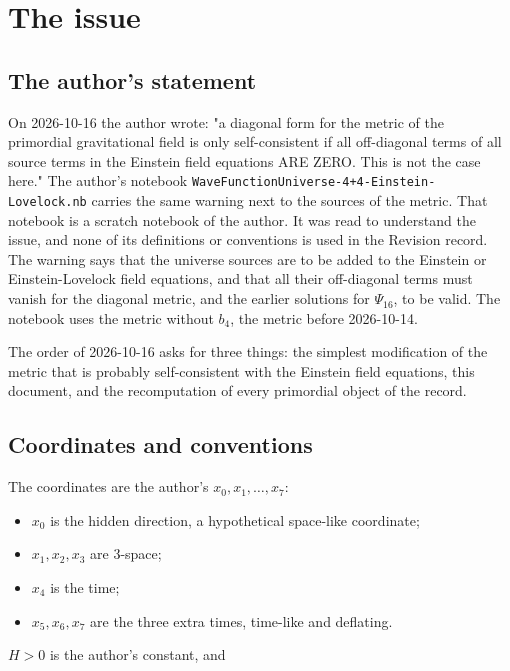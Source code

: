 \documentclass[11pt]{article}
\begin{document}
\section{The issue}

\subsection{The author's statement}

On 2026-10-16 the author wrote: "a diagonal form for the metric of the primordial gravitational field is only self-consistent if all off-diagonal terms of all source terms in the Einstein field equations ARE ZERO. This is not the case here." The author's notebook \texttt{WaveFunc\allowbreak{}tionUniv\allowbreak{}erse-4+4\allowbreak{}-Einstei\allowbreak{}n-Lovelo\allowbreak{}ck.nb} carries the same warning next to the sources of the metric. That notebook is a scratch notebook of the author. It was read to understand the issue, and none of its definitions or conventions is used in the Revision record. The warning says that the universe sources are to be added to the Einstein or Einstein-Lovelock field equations, and that all their off-diagonal terms must vanish for the diagonal metric, and the earlier solutions for $\Psi_{16}$, to be valid. The notebook uses the metric without $b_4$, the metric before 2026-10-14.

The order of 2026-10-16 asks for three things: the simplest modification of the metric that is probably self-consistent with the Einstein field equations, this document, and the recomputation of every primordial object of the record.

\subsection{Coordinates and conventions}

The coordinates are the author's $x_0, x_1, \dots, x_7$:

\begin{itemize}
\item $x_0$ is the hidden direction, a hypothetical space-like coordinate;
\item $x_1, x_2, x_3$ are 3-space;
\item $x_4$ is the time;
\item $x_5, x_6, x_7$ are the three extra times, time-like and deflating.
\end{itemize}

$H > 0$ is the author's constant, and
\end{document}
